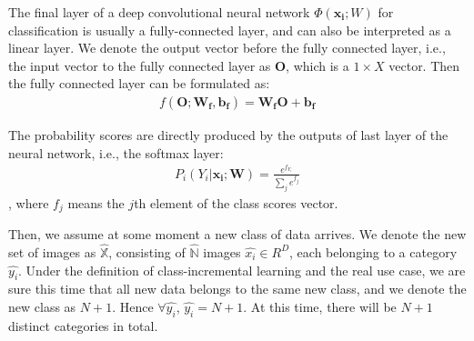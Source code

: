 The final layer of a deep convolutional neural network $\Phi(\mathbf{x_i}; W)$ for classification is usually a fully-connected layer, and can also be interpreted as a linear layer. We denote the output vector before the fully connected layer, i.e., the input vector to the fully connected layer as $\mathbf{O}$, which is a $1 \times X$ vector. Then the fully connected layer can be formulated as:
\begin{align}
f(\mathbf{O}; \mathbf{W_f}, \mathbf{b_f}) =  \mathbf{W_f}\mathbf{O} + \mathbf{b_f}
\end{align}

The probability scores are directly produced by the outputs of last layer of the neural network, i.e., the softmax layer:
\begin{align}
P_i(Y_i|\mathbf{x_i};\mathbf{W}) = \frac{e^{f_{Y_i}}}{\sum_j e^{f_j}}
\end{align}, where $f_j$ means the $j$th element of the class scores vector.

Then, we assume at some moment a new class of data arrives. We denote the new set of images as $\hat{\mathbb{X}}$, consisting of $\hat{\mathbb{N}}$ images $\hat{x_i} \in R^D$, each belonging to a category $\hat{y_i}$. Under the definition of class-incremental learning and the real use case, we are sure this time that all new data belongs to the same new class, and we denote the new class as $N+1$. Hence $\forall \hat{y_i}$, $\hat{y_i}=N+1$. At this time, there will be $N+1$ distinct categories in total. 

